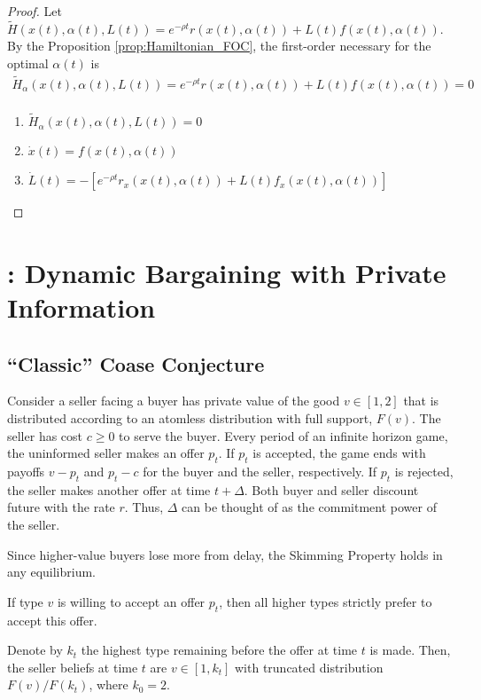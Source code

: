 \documentclass[11pt]{elegantbook}
\begin{document}
\begin{proof}
    Let $\tilde{H}(x(t),\alpha(t),L(t))=e^{-\rho t}r(x(t),\alpha(t))+L(t)f(x(t),\alpha(t))$. By the Proposition \ref{prop:Hamiltonian_FOC}, the first-order necessary for the optimal $\alpha(t)$ is
    \begin{equation}
        \begin{aligned}
            \tilde{H}_\alpha(x(t),\alpha(t),L(t))=e^{-\rho t}r(x(t),\alpha(t))+L(t)f(x(t),\alpha(t))=0\\
        \end{aligned}
        \nonumber
    \end{equation}
    \begin{enumerate}
        \item $\tilde{H}_\alpha(x(t),\alpha(t),L(t))=0$
        \item $\dot{x}(t)=f(x(t),\alpha(t))$
        \item $\dot{L}(t)=-[e^{-\rho t}r_x(x(t),\alpha(t))+L(t)f_x(x(t),\alpha(t))]$
    \end{enumerate}
\end{proof}



\chapter{\cite{fuchs2022dynamic}: Dynamic Bargaining with Private Information}

\section{``Classic'' Coase Conjecture}
Consider a seller facing a buyer has private value of the good $v\in[1,2]$ that is distributed according to an atomless distribution with full support, $F(v)$. The seller has cost $c\geq 0$ to serve the buyer. Every period of an infinite horizon game, the uninformed seller makes an offer $p_t$. If $p_t$ is accepted, the game ends with payoffs $v-p_t$ and $p_t-c$ for the buyer and the seller, respectively. If $p_t$ is rejected, the seller makes another offer at time $t+\Delta$. Both buyer and seller discount future with the rate $r$. Thus, $\Delta$ can be thought of as the commitment power of the seller.

Since higher-value buyers lose more from delay, the Skimming Property holds in any equilibrium.
\begin{lemma}
    If type $v$ is willing to accept an offer $p_t$, then all higher types strictly prefer to accept this offer.
\end{lemma}
Denote by $k_t$ the highest type remaining before the offer at time $t$ is made. Then, the seller beliefs at time $t$ are $v\in[1,k_t]$ with truncated distribution $F(v)/F(k_t)$, where $k_0=2$.
\end{document}
